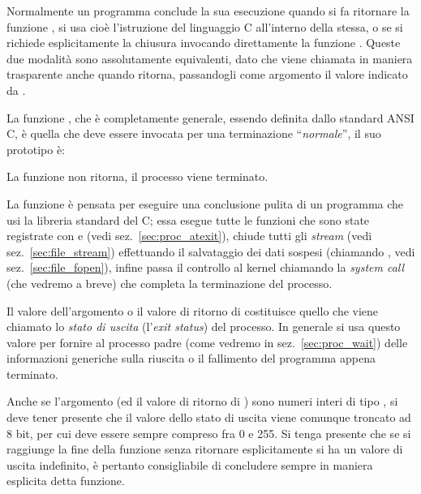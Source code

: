 Normalmente un programma conclude la sua esecuzione quando si fa ritornare la
funzione , si usa cioè l'istruzione  del
linguaggio C all'interno della stessa, o se si richiede esplicitamente la
chiusura invocando direttamente la funzione . Queste due modalità
sono assolutamente equivalenti, dato che  viene chiamata in maniera
trasparente anche quando  ritorna, passandogli come argomento il
valore indicato da .

La funzione , che è completamente generale, essendo definita dallo
standard ANSI C, è quella che deve essere invocata per una terminazione
``\textit{normale}'', il suo prototipo è:

\begin{funcproto}{
}
{La funzione non ritorna, il processo viene terminato.}
\end{funcproto}

La funzione è pensata per eseguire una conclusione pulita di un programma che
usi la libreria standard del C; essa esegue tutte le funzioni che sono state
registrate con  e  (vedi
sez.~\ref{sec:proc_atexit}), chiude tutti gli \textit{stream} (vedi
sez.~\ref{sec:file_stream}) effettuando il salvataggio dei dati sospesi
(chiamando , vedi sez.~\ref{sec:file_fopen}), infine passa il
controllo al kernel chiamando la \textit{system call}  (che
vedremo a breve) che completa la terminazione del processo.


Il valore dell'argomento  o il valore di ritorno di 
costituisce quello che viene chiamato lo \textsl{stato di uscita}
(l'\textit{exit status}) del processo. In generale si usa questo valore per
fornire al processo padre (come vedremo in sez.~\ref{sec:proc_wait}) delle
informazioni generiche sulla riuscita o il fallimento del programma appena
terminato.

Anche se l'argomento  (ed il valore di ritorno di )
sono numeri interi di tipo , si deve tener presente che il valore
dello stato di uscita viene comunque troncato ad 8 bit, per cui deve essere
sempre compreso fra 0 e 255. Si tenga presente che se si raggiunge la fine
della funzione  senza ritornare esplicitamente si ha un valore di
uscita indefinito, è pertanto consigliabile di concludere sempre in maniera
esplicita detta funzione.

